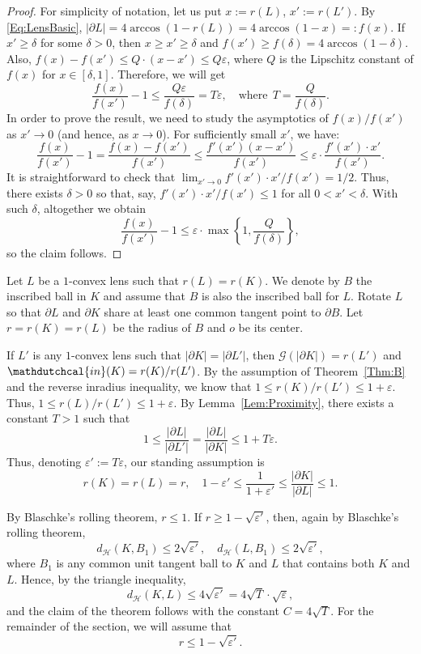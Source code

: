 \documentclass[11pt, oneside]{amsart}
\newcommand{\dH}{d_{\mathcal H}}
\newcommand{\Rr}{\mathdutchcal{in}}
\newcommand{\eps}{\varepsilon}
\renewcommand{\ge}{\geqslant}
\renewcommand{\le}{\leqslant}
\theoremstyle{theorem}
\theoremstyle{Intro}
\theoremstyle{definition}
\theoremstyle{remark}
\theoremstyle{claim}
\numberwithin{equation}{section}
\begin{document}
\begin{proof}
For simplicity of notation, let us put $x := r(L)$, $x' := r(L')$. By \eqref{Eq:LensBasic}, $|\partial L|  = 4 \arccos(1 - r(L)) = 4 \arccos(1 - x) =: f(x)$. If $x' \ge \delta$ for some $\delta > 0$, then $x \ge x' \ge \delta$ and $f(x') \ge f(\delta) = 4 \arccos(1 - \delta)$. Also, $f(x) - f(x') \le Q \cdot (x - x') \le Q \eps$, where $Q$ is the Lipschitz constant of $f(x)$ for $x \in [\delta, 1]$. Therefore, we will get
\[
\frac{f(x)}{f(x')} - 1 \le \frac{Q \eps}{f(\delta)} = T\eps, \quad \text{where}\ \  T= \frac{Q}{f(\delta)}.
\]
In order to prove the result, we need to study the asymptotics of $f(x)/f(x')$ as $x' \to 0$ (and hence, as $x \to 0$). For sufficiently small $x'$, we have:
\[
\frac{f(x)}{f(x')} - 1 = \frac{f(x) - f(x')}{f(x')} \le \frac{f'(x')(x-x')}{f(x')} \le \eps \cdot \frac{f'(x')\cdot x'}{f(x')}.
\]
It is straightforward to check that $\lim_{x' \to 0}{f'(x')\cdot x'}/{f(x')} = 1/2$. Thus, there exists $\delta > 0$ so that, say, ${f'(x')\cdot x'}/{f(x')} \le 1$ for all $0 < x' < \delta$. With such $\delta$, altogether we obtain
\[
\frac{f(x)}{f(x')} - 1 \le \eps \cdot \max \left\{1, \frac{Q}{f(\delta)}\right\},
\]
so the claim follows.
\end{proof}

Let $L$ be a $1$-convex lens such that $r(L) = r(K)$. We denote by $B$ the inscribed ball in $K$ and assume that $B$ is also the inscribed ball for $L$. Rotate $L$ so that $\partial L$ and $\partial K$ share at least one common tangent point to $\partial B$. Let $r = r(K) = r(L)$ be the radius of $B$ and $o$ be its center.

If $L'$ is any $1$-convex lens such that $|\partial K| = |\partial L'|$, then $\mathcal{G}(|\partial K|) = r(L')$ and $\Rr(K) = r(K)/r(L')$. By the assumption of Theorem~\ref{Thm:B} and the reverse inradius inequality, we know that $1 \le {r(K)}/{r(L')} \le 1 + \eps$. Thus, $1 \le {r(L)}/{r(L')} \le 1 + \eps$. By Lemma~\ref{Lem:Proximity}, there exists a constant $T > 1$ such that 
\[
1 \le \frac{|\partial L|}{|\partial L'|} = \frac{|\partial L|}{|\partial K|} \le 1 + T \eps.
\]
Thus, denoting $\eps' := T \eps$, our standing assumption is
\begin{equation}
\label{Eq:Equivalent}
r(K) = r(L) = r, \quad 1 - \eps' \le \frac1{1+\eps'} \le \frac{|\partial K|}{|\partial L|} \le 1.
\end{equation}

By Blaschke's rolling theorem, $r \le 1$. If $r \ge 1 - \sqrt{\eps'}$, then, again by Blaschke's rolling theorem, 
\[
\dH(K, B_1) \le 2 \sqrt{\eps'}, \quad \dH(L,B_1) \le 2 \sqrt{\eps'},
\]
where $B_1$ is any common unit tangent ball to $K$ and $L$ that contains both $K$ and $L$. Hence, by the triangle inequality,
\[
\dH(K,L) \le 4 \sqrt{\eps'} = 4 \sqrt{T} \cdot \sqrt{\eps},
\]
and the claim of the theorem follows with the constant $C = 4\sqrt{T}$. For the remainder of the section, we will assume that
\begin{equation}
\label{Eq:Eps}
r \le 1 - \sqrt{\eps'}.
\end{equation}
\end{document}
